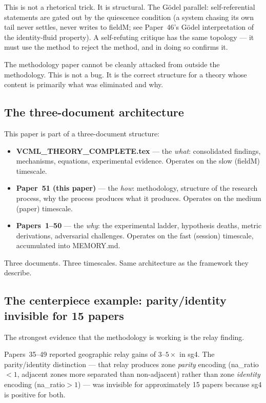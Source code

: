 \documentclass[11pt,a4paper]{article}
\begin{document}
This is not a rhetorical trick.
It is structural.
The Gödel parallel: self-referential statements are gated out by the
quiescence condition (a system chasing its own tail never settles,
never writes to fieldM; see Paper~46's Gödel interpretation of the
identity-fluid property).
A self-refuting critique has the same topology --- it must use the method
to reject the method, and in doing so confirms it.

The methodology paper cannot be cleanly attacked from outside the methodology.
This is not a bug. It is the correct structure for a theory whose
content is primarily what was eliminated and why.

\subsection{The three-document architecture}

This paper is part of a three-document structure:
\begin{itemize}
  \item \textbf{VCML\_THEORY\_COMPLETE.tex} --- the \emph{what}: consolidated findings,
        mechanisms, equations, experimental evidence.
        Operates on the slow (fieldM) timescale.
  \item \textbf{Paper~51 (this paper)} --- the \emph{how}: methodology, structure of
        the research process, why the process produces what it produces.
        Operates on the medium (paper) timescale.
  \item \textbf{Papers~1--50} --- the \emph{why}: the experimental ladder, hypothesis deaths,
        metric derivations, adversarial challenges.
        Operates on the fast (session) timescale, accumulated into MEMORY.md.
\end{itemize}

Three documents. Three timescales. Same architecture as the framework they describe.

\subsection{The centerpiece example: parity/identity invisible for 15 papers}

The strongest evidence that the methodology is working is the relay finding.

Papers~35--49 reported geographic relay gains of $3$--$5\times$ in sg4.
The parity/identity distinction --- that relay produces zone \emph{parity} encoding
(na\_ratio$<1$, adjacent zones more separated than non-adjacent) rather than zone
\emph{identity} encoding (na\_ratio$>1$) --- was invisible for approximately 15 papers
because sg4 is positive for both.
\end{document}
